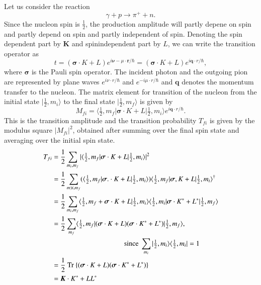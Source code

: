 Let us consider the reaction
$$
\gamma + p \to \pi^+ + n.
$$
Since the nucleon spin is $\frac{1}{2}$, the production amplitude will partly depene on spin and partly depend on spin and partly independent of spin. Denoting the spin dependent part by ${\boldsymbol  K}$ and spinindependent part by $L$, we can write the transition operator as
\setcounter{equation}{30}
\begin{equation}
t= ({\boldsymbol  \sigma \cdot K} + L) e^{i{\boldsymbol  \nu- \mu}\cdot {\boldsymbol  r}/\hbar}= ({\boldsymbol  \sigma \cdot K} + L) e^{i {\boldsymbol  q \cdot r}/\hbar}, \label{chap3-eq31}
\end{equation}
where $\boldsymbol{\sigma}$ is the Pauli spin operator. The incident photon and the outgoing pion are represented by plane waves $e^{i\nu  \cdot r/\hbar}$ and $e^{-i \mu \cdot r /\hbar}$ and ${\boldsymbol  q}$ denotes the momentum transfer to the nucleon. The matrix element for transition of the nucleon from the initial state $|\frac{1}{2}, m_i \rangle$ to the final state $|\frac{1}{2}, m_f \rangle$ is given by
\begin{equation}
  M_{fi} = \langle \tfrac{1}{2}, m_f | {\boldsymbol  \sigma \cdot K} + L | \tfrac{1}{2}, m_i \rangle e^{i {\boldsymbol  q \cdot r}/\hbar}. \label{chap3-eq32}
\end{equation}
This is the transition amplitude and the transition probability $T_{fi}$ is given by the modulus square $|M_{fi}|^2$, obtained after summing over the final spin state and averaging over the initial spin state.
\begin{align}
  T_{fi} & = \frac{1}{2} \sum_{m_i, m_f} | \langle \tfrac{1}{2}, m_f | {\boldsymbol  \sigma \cdot K} + L | \tfrac{1}{2}, m_i\rangle|^2 \notag \\
  & = \frac{1}{2} \sum_{m)i, m_f} (\langle \tfrac{1}{2}, m_f | {\boldsymbol  \sigma. \cdot K + L}| \tfrac{1}{2}, m_i \rangle) \langle \tfrac{1}{2}, m_f | {\boldsymbol  \sigma, K + L}| \tfrac{1}{2}, m_i \rangle^\dagger \notag\\
  & = \frac{1}{2} \sum_{m_i, m_f} \langle \tfrac{1}{2}, m_f + {\boldsymbol  \sigma \cdot K} + L | \tfrac{1}{2}, m_i \rangle \langle \tfrac{1}{2} , m_i | {\boldsymbol  \sigma \cdot K^\ast}+ L^\ast| \tfrac{1}{2}, m_f \rangle \notag\\
  & = \frac{1}{2} \sum_{m_f} \langle \tfrac{1}{2}, m_f | ({\boldsymbol  \sigma \cdot K} + L) ({\boldsymbol  \sigma \cdot K^\ast} + L^\ast) | \tfrac{1}{2}, m_f \rangle,\notag\\
  & \qquad \qquad \qquad \qquad \qquad ~\text{since}~ \sum_{m_i} |\tfrac{1}{2}, m_i \rangle \langle \tfrac{1}{2}, m_i| =1 \notag\\
  & = \frac{1}{2} ~\text{Tr}~  \{ ({\boldsymbol  \sigma \cdot K}+L)({\boldsymbol  \sigma \cdot K^\ast}
  + L^\ast)\}\notag \\
  & = {\boldsymbol  K \cdot K^\ast} + LL^\ast \label{chap3-eq33}
\end{align}
